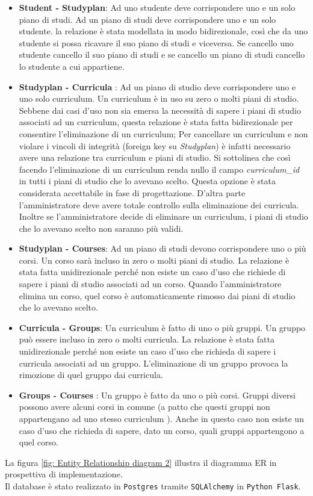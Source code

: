 \documentclass{article}
\begin{document}
\begin{itemize}
\item \textbf{Student - Studyplan}: Ad uno studente deve corrispondere uno e un solo piano di studi. Ad un piano di studi deve corrispondere uno e un solo studente. la relazione è stata modellata in modo bidirezionale, così che da uno studente si possa ricavare il suo piano di studi e viceversa. Se cancello uno studente  cancello il suo piano di studi e se cancello un piano di studi cancello lo studente a cui appartiene.
\item \textbf{Studyplan - Curricula }: Ad un piano di studio deve corrispondere uno e uno solo curriculum. Un curriculum è in uso su zero o molti piani di studio. Sebbene dai casi d'uso non sia emersa la necessità di sapere i piani di studio associati ad un curriculum, questa relazione è stata fatta bidirezionale per consentire l'eliminazione di un curriculum; Per cancellare un curriculum e non violare i vincoli di integrità  (foreign key su \emph{Studyplan}) è infatti necessario avere una relazione tra curriculum e piani di studio. Si sottolinea che così facendo l'eliminazione di un curriculum renda nullo il campo \emph{curriculum\_id} in tutti i piani di studio che lo avevano scelto. Questa opzione è stata considerata accettabile in fase di progettazione. D'altra parte l'amministratore deve avere totale controllo sulla eliminazione dei curricula. Inoltre se l'amministratore decide di eliminare un curriculum, i piani di studio che lo avevano scelto non saranno più validi.
\item \textbf{Studyplan - Courses}:  Ad un piano di studi devono corrispondere uno o più corsi. Un corso sarà incluso in zero o molti piani di studio.  La relazione è stata fatta unidirezionale perché non esiste un caso d'uso che richiede di sapere i piani di studio associati ad un corso. Quando l'amministratore elimina un corso, quel corso è automaticamente rimosso dai piani di studio che lo  avevano scelto.
\item \textbf{Curricula - Groups}: Un curriculum è fatto di uno o più gruppi. Un gruppo può essere incluso in zero o molti curricula. La relazione è stata fatta unidirezionale perché non esiste un caso d'uso che richieda di sapere i curricula associati ad un gruppo. L'eliminazione di un gruppo provoca la rimozione di quel gruppo dai curricula.
\item \textbf{Groups - Courses }: Un gruppo è fatto da uno o più corsi. Gruppi diversi possono avere alcuni corsi in comune (a patto che questi gruppi non appartengano ad uno stesso curriculum ). Anche in questo caso non esiste un caso d'uso che richieda di sapere, dato un corso, quali gruppi appartengono a quel corso.
\end{itemize}
La figura \ref{fig: Entity Relationship diagram 2} illustra il diagramma ER in prospettiva di implementazione.\\
Il database è stato realizzato in \texttt{Postgres} tramite \texttt{SQLAlchemy} in \texttt{Python Flask}.
\end{document}
